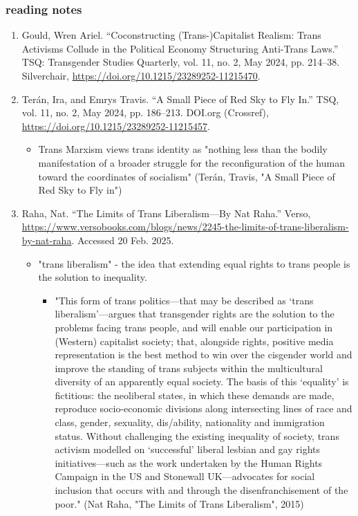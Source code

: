 \documentclass[11pt]{article}
\begin{document}
\subsubsection{reading notes}
\label{sec:orgfc79ac8}
\begin{enumerate}
\item Gould, Wren Ariel. “Coconstructing (Trans-)Capitalist Realism: Trans Activisms Collude in the Political Economy Structuring Anti-Trans Laws.” TSQ: Transgender Studies Quarterly, vol. 11, no. 2, May 2024, pp. 214–38. Silverchair, \url{https://doi.org/10.1215/23289252-11215470}.
\label{sec:org161c339}
\item Terán, Ira, and Emrys Travis. “A Small Piece of Red Sky to Fly In.” TSQ, vol. 11, no. 2, May 2024, pp. 186–213. DOI.org (Crossref), \url{https://doi.org/10.1215/23289252-11215457}.
\label{sec:org8b877f4}
\begin{itemize}
\item Trans Marxism views trans identity as "nothing less than the bodily
manifestation of a broader struggle for the reconfiguration of the
human toward the coordinates of socialism" (Terán, Travis, "A Small
Piece of Red Sky to Fly in")
\end{itemize}

\item Raha, Nat. “The Limits of Trans Liberalism—By Nat Raha.” Verso, \url{https://www.versobooks.com/blogs/news/2245-the-limits-of-trans-liberalism-by-nat-raha}. Accessed 20 Feb. 2025.
\label{sec:org8ca7b30}
\begin{itemize}
\item "trans liberalism" - the idea that extending equal rights to trans
people is the solution to inequality. 
\begin{itemize}
\item "This form of trans politics—that may be described as ‘trans
liberalism’—argues that transgender rights are the solution to the
problems facing trans people, and will enable our participation in
(Western) capitalist society; that, alongside rights, positive
media representation is the best method to win over the cisgender
world and improve the standing of trans subjects within the
multicultural diversity of an apparently equal society. The basis
of this ‘equality’ is fictitious: the neoliberal states, in which
these demands are made, reproduce socio-economic divisions along
intersecting lines of race and class, gender, sexuality,
dis/ability, nationality and immigration status. Without
challenging the existing inequality of society, trans activism
modelled on ‘successful’ liberal lesbian and gay rights
initiatives—such as the work undertaken by the Human Rights
Campaign in the US and Stonewall UK—advocates for social inclusion
that occurs with and through the disenfranchisement of the poor."
(Nat Raha, "The Limits of Trans Liberalism", 2015)
\end{itemize}
\end{itemize}


\end{enumerate}
\end{document}
